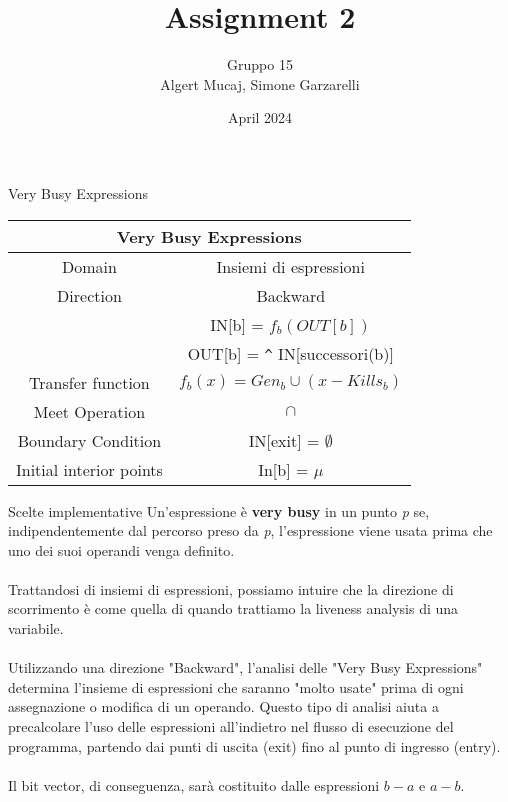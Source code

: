 \documentclass{article}
\title{Assignment 2}
\author{Gruppo 15\\Algert Mucaj, Simone Garzarelli}
\date{April 2024}
\begin{document}
	\maketitle
\begin{section}{Very Busy Expressions}
	

\large %
\renewcommand{\arraystretch}{1.5} %

	
\begin{longtable}{| c | c |}
	\hline
	\multicolumn{2}{|c|}{\textbf{Very Busy Expressions}} \\
	\hline
	Domain & Insiemi di espressioni \\
	\hline
	Direction & Backward \\
	  & IN[b] = $f_b (OUT[b])$ \\
	  & OUT[b] = \verb*|^| IN[successori(b)] \\
	\hline
	Transfer function &  $f_b(x) = Gen_b \cup (x - Kills_b)$\\
	\hline
	Meet Operation & $\cap$ \\
	\hline
	Boundary Condition & IN[exit] = $\emptyset$ \\
	\hline
	Initial interior points & In[b] = $\mu$ \\
	\hline
\end{longtable}

\begin{subsection}{Scelte implementative}
	Un’espressione è \textbf{very busy} in un
	punto \textit{p} se, indipendentemente
	dal percorso preso da \textit{p},
	l’espressione viene usata prima
	che uno dei suoi operandi venga
	definito. \\ \\
	Trattandosi di insiemi di espressioni, possiamo intuire che la direzione di scorrimento è come quella di quando trattiamo la liveness analysis di una variabile.
	\\\\
	Utilizzando una direzione "Backward", l'analisi delle "Very Busy Expressions" determina l'insieme di espressioni che saranno "molto usate" prima di ogni assegnazione o modifica di un operando. Questo tipo di analisi aiuta a precalcolare l'uso delle espressioni all'indietro nel flusso di esecuzione del programma, partendo dai punti di uscita (exit) fino al punto di ingresso (entry).
	\\ \\
	Il bit vector, di conseguenza, sarà costituito dalle espressioni $b-a$ e $a-b$.\\
	

\end{subsection}
\end{section}
\end{document}
